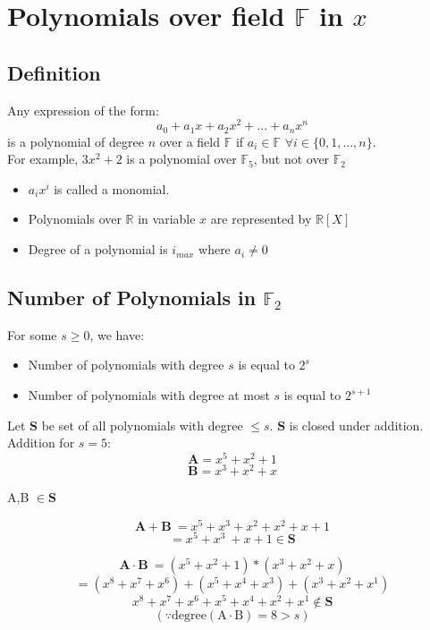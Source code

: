 \documentclass[11pt]{article}
\theoremstyle{definition}
\theoremstyle{plain}
\begin{document}
\section{Polynomials over field $\mathbb{F}$ in $x$}
\subsection{Definition}
Any expression of the form:
\[a_{0} + a_{1}x + a_{2}x^{2} + ... + a_{n}x^{n} \]
is a polynomial of degree $n$ over a field $\mathbb{F}$ if $a_{i} \in \mathbb{F}$ $ \forall i \in \{0,1,...,n\}.$\\

For example, $3x^{2} + 2$ is a polynomial over $\mathbb{F}_{5}$, but not over $\mathbb{F}_{2}$

\begin{itemize}
    \item  $a_{i}x^{i}$ is called a monomial. 
    \item  Polynomials over $ \mathbb{R} $ in variable $x$ are represented by $ \mathbb{R}[X] $
    \item Degree of a polynomial is $i_{max}$ where $a_{i} \neq 0$ 
\end{itemize}

\subsection{Number of Polynomials in $ \mathbb{F}_{2} $}

For some  $s \geq 0$, we have:
\begin{itemize}
    \item Number of polynomials with degree $s$ is equal to $2^{s}$
    \item Number of polynomials with degree at most $s$ is equal to $2^{s+1}$
\end{itemize}
    
Let $\mathbf{S}$ be set of all polynomials with degree $\leq s$. $\mathbf{S}$ is closed under addition.\\

Addition for $s=5$:
\[\mathbf{A} =  x^{5} + x^{2} + 1\]
\[\mathbf{B} =  x^{3} + x^{2} + x\]

A,B $\in \mathbf{S} $

\[\mathbf{A}  + \mathbf{B}\ = x^{5} + x^{3} + x^{2} + x^{2} + x + 1 \]
\[= x^{5} + x^{3}\ + x + 1 \in \mathbf{S} \]

\[\mathbf{A}  \cdot \mathbf{B}\ = (x^{5} + x^{2} + 1) * (x^{3} + x^{2} + x)\]
\[= (x^{8} + x^{7} + x^{6}) + (x^{5} + x^{4} + x^{3}) + (x^{3} + x^{2} + x^{1})\]
\[x^{8} + x^{7} + x^{6}+ x^{5} + x^{4} + x^{2} + x^{1} 
\notin \mathbf{S} \]
\[(\because \text{degree} (\text{A} \cdot \text{B}) = 8 > s)\]
\end{document}
